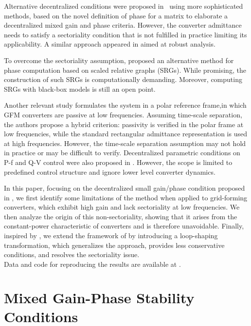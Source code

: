 Alternative decentralized conditions were proposed in~\cite{huangGainPhaseDecentralized2024} using more sophisticated methods, based on the novel definition of phase for a matrix to elaborate a decentralized mixed gain and phase criteria. However, the converter admittance needs to satisfy a sectoriality condition that is not fulfilled in practice
limiting its applicability. A similar approach appeared in \cite{woolcockMixedGainPhase2023} aimed at robust analysis.

To overcome the sectoriality assumption, \cite{baron2025decentralized} proposed an alternative method for phase computation based on scaled relative graphs (SRGs). While promising, the construction of such SRGs is computationally demanding. Moreover, computing SRGs with black-box models is still an open point.

Another relevant study \cite{deyPassivityBasedDecentralizedCriteria2023} formulates the system in a polar reference frame,in which GFM converters are passive at low frequencies. Assuming time-scale separation, the authors propose a hybrid criterion: passivity is verified in the polar frame at low frequencies, while the standard rectangular admittance representation is used at high frequencies. However, the time-scale separation assumption may not hold in practice or may be difficult to verify. Decentralized parametric conditions on P-f and Q-V control were also proposed in \cite{häberle2025decentralizedparametricstabilitycertificates}. However, the scope is limited to predefined control structure and ignore lower level converter dynamics.

In this paper, focusing on the decentralized small gain/phase condition proposed in \cite{huangGainPhaseDecentralized2024}, we first identify some limitations of the method when applied to grid-forming converters, which exhibit high gain and lack sectoriality at low frequencies. We then analyze the origin of this non-sectoriality, showing that it arises from the constant-power characteristic of converters and is therefore unavoidable. Finally, inspired by \cite{deyPassivityBasedDecentralizedCriteria2023}, we extend the framework of \cite{huangGainPhaseDecentralized2024} by introducing a loop-shaping transformation, which generalizes the approach, provides less conservative conditions, and resolves the sectoriality issue.\\
Data and code for reproducing the results are available at \cite{Repo}.

\section{Mixed Gain-Phase Stability Conditions}

